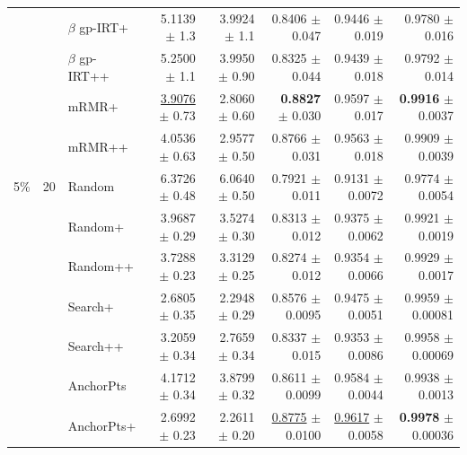 \begin{longtable}{llp{}rrrrr}
 &  & $\beta$ gp-IRT+ & 5.1139 {\scriptsize $\pm$ 1.3} & 3.9924 {\scriptsize $\pm$ 1.1} & 0.8406 {\scriptsize $\pm$ 0.047} & 0.9446 {\scriptsize $\pm$ 0.019} & 0.9780 {\scriptsize $\pm$ 0.016} \\
 &  & $\beta$ gp-IRT++ & 5.2500 {\scriptsize $\pm$ 1.1} & 3.9950 {\scriptsize $\pm$ 0.90} & 0.8325 {\scriptsize $\pm$ 0.044} & 0.9439 {\scriptsize $\pm$ 0.018} & 0.9792 {\scriptsize $\pm$ 0.014} \\
 &  & mRMR+ & \underline{3.9076} {\scriptsize $\pm$ 0.73} & 2.8060 {\scriptsize $\pm$ 0.60} & \textbf{0.8827} {\scriptsize $\pm$ 0.030} & 0.9597 {\scriptsize $\pm$ 0.017} & \textbf{0.9916} {\scriptsize $\pm$ 0.0037} \\
 &  & mRMR++ & 4.0536 {\scriptsize $\pm$ 0.63} & 2.9577 {\scriptsize $\pm$ 0.50} & 0.8766 {\scriptsize $\pm$ 0.031} & 0.9563 {\scriptsize $\pm$ 0.018} & 0.9909 {\scriptsize $\pm$ 0.0039} \\
\midrule
5\% & 20 & Random & 6.3726 {\scriptsize $\pm$ 0.48} & 6.0640 {\scriptsize $\pm$ 0.50} & 0.7921 {\scriptsize $\pm$ 0.011} & 0.9131 {\scriptsize $\pm$ 0.0072} & 0.9774 {\scriptsize $\pm$ 0.0054} \\
 &  & Random+ & 3.9687 {\scriptsize $\pm$ 0.29} & 3.5274 {\scriptsize $\pm$ 0.30} & 0.8313 {\scriptsize $\pm$ 0.012} & 0.9375 {\scriptsize $\pm$ 0.0062} & 0.9921 {\scriptsize $\pm$ 0.0019} \\
 &  & Random++ & 3.7288 {\scriptsize $\pm$ 0.23} & 3.3129 {\scriptsize $\pm$ 0.25} & 0.8274 {\scriptsize $\pm$ 0.012} & 0.9354 {\scriptsize $\pm$ 0.0066} & 0.9929 {\scriptsize $\pm$ 0.0017} \\
 &  & Search+ & 2.6805 {\scriptsize $\pm$ 0.35} & 2.2948 {\scriptsize $\pm$ 0.29} & 0.8576 {\scriptsize $\pm$ 0.0095} & 0.9475 {\scriptsize $\pm$ 0.0051} & 0.9959 {\scriptsize $\pm$ 0.00081} \\
 &  & Search++ & 3.2059 {\scriptsize $\pm$ 0.34} & 2.7659 {\scriptsize $\pm$ 0.34} & 0.8337 {\scriptsize $\pm$ 0.015} & 0.9353 {\scriptsize $\pm$ 0.0086} & 0.9958 {\scriptsize $\pm$ 0.00069} \\
 &  & AnchorPts & 4.1712 {\scriptsize $\pm$ 0.34} & 3.8799 {\scriptsize $\pm$ 0.32} & 0.8611 {\scriptsize $\pm$ 0.0099} & 0.9584 {\scriptsize $\pm$ 0.0044} & 0.9938 {\scriptsize $\pm$ 0.0013} \\
 &  & AnchorPts+ & 2.6992 {\scriptsize $\pm$ 0.23} & 2.2611 {\scriptsize $\pm$ 0.20} & \underline{0.8775} {\scriptsize $\pm$ 0.0100} & \underline{0.9617} {\scriptsize $\pm$ 0.0058} & \textbf{0.9978} {\scriptsize $\pm$ 0.00036} \\

\end{longtable}
